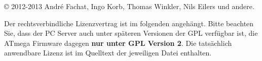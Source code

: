 \documentclass[10pt,a4paper]{scrartcl}		%
\begin{document}
\copyright{} 2012-2013 André Fachat, Ingo Korb, Thomas Winkler,
Nils Eilers und andere.

Der rechtsverbindliche Lizenzvertrag ist im folgenden angehängt.
Bitte beachten Sie, dass der PC Server auch unter späteren
Versionen der GPL verfügbar ist, die ATmega Firmware dagegen
\textbf{nur unter GPL Version 2}. Die tatsächlich anwendbare
Lizenz ist im Quelltext der jeweiligen Datei enthalten.




\printindex
\end{document}
